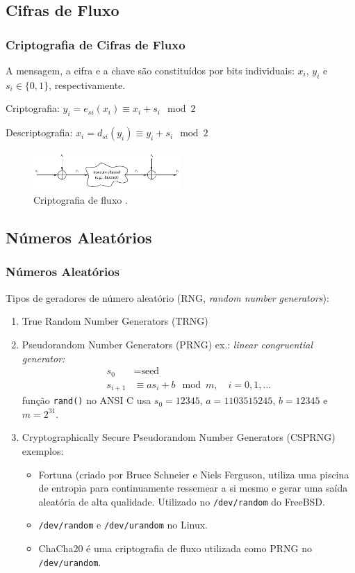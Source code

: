 \subsection{Cifras de Fluxo}
\begin{frame}[allowframebreaks]
\frametitle{Criptografia de Cifras de Fluxo}
A mensagem, a cifra e a chave são constituídos por bits individuais: $x_i$, $y_i$ e $s_i \in \{0,1\}$, respectivamente.

Criptografia: $y_i = e_{si} (x_i) \equiv x_i + s_i \mod 2$

Descriptografia: $x_i = d_{si} (y_i) \equiv y_i + s_i \mod 2$

\begin{figure}[h]
\centering
\includegraphics[width=0.5\textwidth,height=0.5\textheight,keepaspectratio]{figures/streamcipher.png}
\caption{Criptografia de fluxo \cite{paar2014}.}
\label{fig-streamcipher}
\end{figure}
\end{frame}


\subsection{Números Aleatórios}
\begin{frame}[allowframebreaks]
\frametitle{Números Aleatórios}

Tipos de geradores de número aleatório (RNG, \emph{random number generators}):
\begin{enumerate}
\item True Random Number Generators (TRNG)
\item Pseudorandom Number Generators (PRNG)
    ex.: \emph{linear congruential generator:}
    \begin{align}
    s_0 &= \text{seed} \\
    s_{i+1} &\equiv a s_i + b \mod m, \quad i = 0, 1, \ldots
    \end{align}
    função \texttt{rand()} no ANSI C usa $s_0 = 12345$, $a = 1103515245$, $b = 12345$ e $m = 2^{31}$.
\item Cryptographically Secure Pseudorandom Number Generators (CSPRNG)\\
    exemplos:
    \begin{itemize}
	\item Fortuna (criado por Bruce Schneier e Niels Ferguson, utiliza uma piscina de entropia para 
	    continuamente ressemear a si mesmo e gerar uma saída aleatória de alta qualidade.
	    Utilizado no \texttt{/dev/random} do FreeBSD.
        \item \texttt{/dev/random} e \texttt{/dev/urandom} no Linux.
	\item ChaCha20 é uma criptografia de fluxo utilizada como PRNG no \texttt{/dev/urandom}.
    \end{itemize}
\end{enumerate}
\end{frame}


